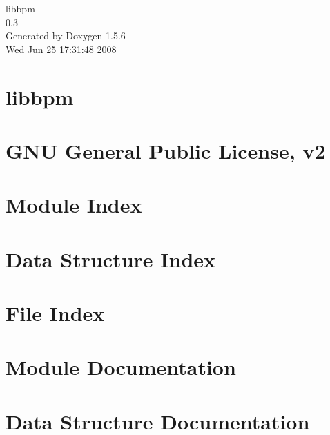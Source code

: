 \documentclass[a4paper]{article}
\begin{document}
\begin{titlepage}
\vspace*{7cm}
\begin{center}
{\Large libbpm \\[1ex]\large 0.3 }\\
\vspace*{1cm}
{\large Generated by Doxygen 1.5.6}\\
\vspace*{0.5cm}
{\small Wed Jun 25 17:31:48 2008}\\
\end{center}
\end{titlepage}
\tableofcontents
{}
\section{libbpm}
\label{index}
\section{GNU General Public License, v2}
\label{licence}

\section{Module Index}

\section{Data Structure Index}

\section{File Index}

\section{Module Documentation}











\section{Data Structure Documentation}

















\end{document}
